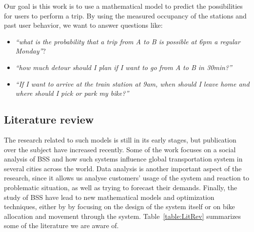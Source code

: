 Our goal is this work is to use a mathematical model to predict the
possibilities for users to perform a trip. By using the measured
occupancy of the stations and past user behavior, we want to answer
questions like:
\begin{itemize}
\item \emph{``what is the probability that a trip from A to B is
    possible at 6pm a regular Monday''}? 
\item \emph{``how much detour should I plan if I want to go from A to
    B in 30min?''}
\item \emph{``If I want to arrive at the train station at 9am, when
    should I leave home and where should I pick or park my bike?''}
\end{itemize}

\subsection{Literature review}

The research related to such models is still in its early stages, but
publication over the subject have increased recently.  Some of the
work focuses on a social analysis of BSS and how such systems
influence global transportation system in several cities across the
world.  Data analysis is another important aspect of the research,
since it allows us analyse customers' usage of the system and reaction
to problematic situation, as well as trying to forecast their demands.
Finally, the study of BSS have lead to new mathematical models and
optimization techniques, either by by focusing on the design of the
system itself or on bike allocation and movement through the system.
Table~\ref{table:LitRev} summarizes some of the literature we are
aware of.


